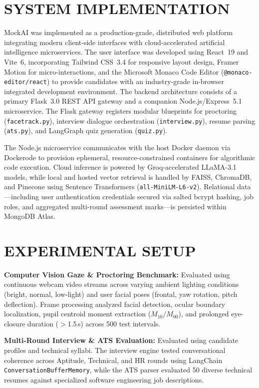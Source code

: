 \documentclass[12pt,a4paper]{report}
\begin{document}
\section{SYSTEM IMPLEMENTATION}

MockAI was implemented as a production-grade, distributed web platform integrating
modern client-side interfaces with cloud-accelerated artificial intelligence microservices.
The user interface was developed using React~19 and Vite~6, incorporating Tailwind
CSS~3.4 for responsive layout design, Framer Motion for micro-interactions, and the
Microsoft Monaco Code Editor (\texttt{@monaco-editor/react}) to provide candidates with
an industry-grade in-browser integrated development environment. The backend architecture
consists of a primary Flask~3.0 REST API gateway and a companion Node.js/Express~5.1
microservice. The Flask gateway registers modular blueprints for proctoring
(\texttt{facetrack.py}), interview dialogue orchestration (\texttt{interview.py}), resume
parsing (\texttt{ats.py}), and LangGraph quiz generation (\texttt{quiz.py}).

The Node.js microservice communicates with the host Docker daemon via Dockerode to
provision ephemeral, resource-constrained containers for algorithmic code execution.
Cloud inference is powered by Groq-accelerated LLaMA-3.1 models, while local and
hosted vector retrieval is handled by FAISS, ChromaDB, and Pinecone using Sentence
Transformers (\texttt{all-MiniLM-L6-v2}). Relational data---including user authentication
credentials secured via salted bcrypt hashing, job roles, and aggregated multi-round
assessment marks---is persisted within MongoDB Atlas.

\section{EXPERIMENTAL SETUP}

\textbf{Computer Vision Gaze \& Proctoring Benchmark:} Evaluated using continuous
webcam video streams across varying ambient lighting conditions (bright, normal, low-light)
and user facial poses (frontal, yaw rotation, pitch deflection). Frame processing analyzed
facial detection, ocular boundary localization, pupil centroid moment extraction
($M_{10}/M_{00}$), and prolonged eye-closure duration ($>$1.5\,s) across 500 test intervals.

\textbf{Multi-Round Interview \& ATS Evaluation:} Evaluated using candidate profiles and
technical syllabi. The interview engine tested conversational coherence across Aptitude,
Technical, and HR rounds using LangChain \texttt{ConversationBufferMemory}, while the
ATS parser evaluated 50 diverse technical resumes against specialized software engineering
job descriptions.
\end{document}

